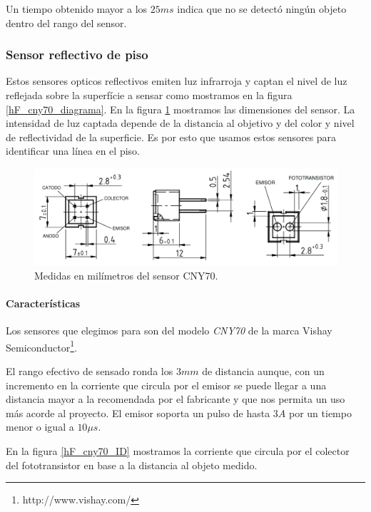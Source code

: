 Un tiempo obtenido mayor a los $25ms$ indica que no se detect\'o ning\'un objeto dentro del rango del sensor.

\subsubsection{Sensor reflectivo de piso}
\label{h_sensado_piso}

Estos sensores opticos reflectivos emiten luz infrarroja y captan el nivel de luz reflejada sobre la superf\'icie a sensar
como mostramos en la figura \ref{hF_cny70_diagrama}.
En la figura \ref{hF_cny70_dim} mostramos las dimensiones del sensor.
La intensidad de luz captada depende de la distancia al objetivo y del color y nivel de reflectividad de la superficie.
Es por esto que usamos estos sensores para identificar una l\'inea en el piso.

\begin{figure}[ht]
	\centering
	\includegraphics[scale=0.25]{figuras/cny70_dim.png}
	\caption{Medidas en mil\'imetros del sensor CNY70.}
	\label{hF_cny70_dim}
\end{figure}

\paragraph{Caracter\'isticas}
\label{h_sensado_piso_caracteristicas}

Los sensores que elegimos para son del modelo \emph{CNY70} de la marca Vishay Semiconductor\footnote{http://www.vishay.com/}.

El rango efectivo de sensado ronda los $3 mm$ de distancia aunque, con un incremento en la corriente que circula por el emisor
se puede llegar a una distancia mayor a la recomendada por el fabricante y que nos permita un uso m\'as acorde al proyecto.
El emisor soporta un pulso de hasta $3 A$ por un tiempo menor o igual a $10\mu s$.

En la figura \ref{hF_cny70_ID} mostramos la corriente que circula por el colector del fototransistor en base a la distancia al objeto medido.

